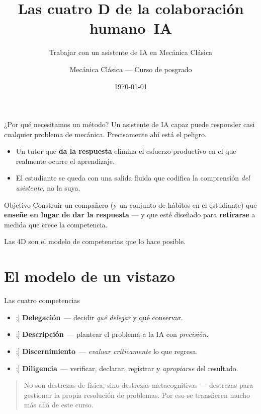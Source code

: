 \documentclass[aspectratio=169,11pt]{beamer}
\title{Las cuatro D de la colaboración humano--IA}
\subtitle{Trabajar con un asistente de IA en Mecánica Clásica}
\author{Mecánica Clásica --- Curso de posgrado}
\date{\today}
\institute{Delegación \ $\cdot$\ Descripción \ $\cdot$\ Discernimiento \ $\cdot$\ Diligencia}
\newcommand{\Del}{\textcolor{Cdel}{\textbf{Delegación}}}
\newcommand{\Des}{\textcolor{Cdes}{\textbf{Descripción}}}
\newcommand{\Dis}{\textcolor{Cdis}{\textbf{Discernimiento}}}
\newcommand{\Dil}{\textcolor{Cdil}{\textbf{Diligencia}}}
\newcommand{\chip}[2]{\tikz[baseline=-0.6ex]\node[fill=#1,text=white,rounded corners=2pt,
  inner sep=2.5pt,font=\scriptsize\bfseries]{#2};}
\begin{document}
\maketitle

\begin{frame}[shrink=20]{¿Por qué necesitamos un método?}
  Un asistente de IA capaz puede \alert{responder} casi cualquier problema de
  mecánica. Precisamente ahí está el peligro.
  \vspace{0.6em}
  \begin{itemize}
    \item Un tutor que \textbf{da la respuesta} elimina el esfuerzo productivo en el
          que realmente ocurre el aprendizaje.
    \item El estudiante se queda con una salida fluida que codifica la comprensión
          \emph{del asistente}, no la suya.
  \end{itemize}
  \vspace{0.6em}
  \begin{alertblock}{Objetivo}
    Construir un compañero (y un conjunto de hábitos en el estudiante) que
    \textbf{enseñe en lugar de dar la respuesta} --- y que esté diseñado para
    \textbf{retirarse} a medida que crece la competencia.
  \end{alertblock}
  \vspace{0.3em}
  Las 4D son el modelo de competencias que lo hace posible.
\end{frame}

\section{El modelo de un vistazo}

\begin{frame}{Las cuatro competencias}
  \setlength{\leftmargini}{1.2em}
  \begin{itemize}\setlength\itemsep{0.55em}
    \item[\chip{Cdel}{D1}] \Del\ --- decidir \emph{qué delegar} y qué conservar.
    \item[\chip{Cdes}{D2}] \Des\ --- plantear el problema a la IA con \emph{precisión}.
    \item[\chip{Cdis}{D3}] \Dis\ --- \emph{evaluar críticamente} lo que regresa.
    \item[\chip{Cdil}{D4}] \Dil\ --- verificar, declarar, registrar y \emph{apropiarse}
          del resultado.
  \end{itemize}
  \vspace{0.7em}
  \begin{quote}
    No son destrezas de física, sino destrezas \alert{metacognitivas} --- destrezas
    para gestionar la propia resolución de problemas. Por eso se transfieren mucho más
    allá de este curso.
  \end{quote}
\end{frame}
\end{document}
